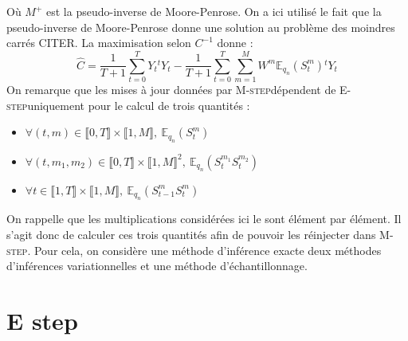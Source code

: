 \documentclass[10pt,a4paper]{article}
\newcommand{\Estep}{\textsc{E-step}}
\newcommand{\Mstep}{\textsc{M-step}}
\begin{document}
Où $M^+$ est la pseudo-inverse de Moore-Penrose. On a ici utilisé le fait que la pseudo-inverse de Moore-Penrose donne une solution au problème des moindres carrés CITER. La maximisation selon $C^{-1}$ donne :
\begin{equation}
\widehat{C}=\frac{1}{T+1}\underset{t=0}{\overset{T}{\sum}}Y_t {}^tY_t-\frac{1}{T+1}\underset{t=0}{\overset{T}{\sum}}\underset{m=1}{\overset{M}{\sum}}W^m\mathbb{E}_{q_n}(S_t^m){}^t Y_t
\end{equation}
On remarque que les mises à jour données par \Mstep dépendent de \Estep uniquement pour le calcul de trois quantités :
\begin{itemize}
\item $\forall (t,m) \in \llbracket 0, T\rrbracket \times \llbracket 1,M \rrbracket, \ \mathbb{E}_{q_n}(S_t^m) $
\item $\forall (t,m_1,m_2) \in \llbracket 0, T\rrbracket \times \llbracket 1,M\rrbracket^2, \ \mathbb{E}_{q_n}(S_t^{m_1}S_t^{m_2}) $
\item $\forall t \in \llbracket 1,T \rrbracket \times \llbracket 1,M \rrbracket, \ \mathbb{E}_{q_n}(S_{t-1}^mS_t^{m})$
\end{itemize}
On rappelle que les multiplications considérées ici le sont élément par élément. Il s'agit donc de calculer ces trois quantités afin de pouvoir les réinjecter dans \Mstep. Pour cela, on considère une méthode d'inférence exacte deux méthodes d'inférences variationnelles et une méthode d'échantillonnage.
\section{E step}
\end{document}
